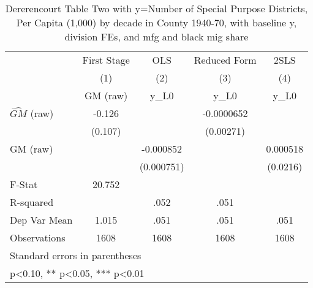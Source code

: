 \begin{table}[htbp]\centering
\def\sym#1{\ifmmode^{#1}\else\(^{#1}\)\fi}
\caption{Dererencourt Table Two with y=Number of Special Purpose Districts, Per Capita (1,000) by decade in County 1940-70, with baseline y, division FEs, and mfg and black mig share}
\begin{tabular}{l*{4}{c}}
\toprule
                    & First Stage   &         OLS   &Reduced Form   &        2SLS   \\
                    &\multicolumn{1}{c}{(1)}&\multicolumn{1}{c}{(2)}&\multicolumn{1}{c}{(3)}&\multicolumn{1}{c}{(4)}\\
                    &\multicolumn{1}{c}{GM  (raw)}&\multicolumn{1}{c}{y\_L0}&\multicolumn{1}{c}{y\_L0}&\multicolumn{1}{c}{y\_L0}\\
\midrule
$\hat{GM}$ (raw)    &      -0.126   &               &  -0.0000652   &               \\
                    &     (0.107)   &               &   (0.00271)   &               \\
\addlinespace
GM  (raw)           &               &   -0.000852   &               &    0.000518   \\
                    &               &  (0.000751)   &               &    (0.0216)   \\
\midrule
F-Stat              &      20.752   &               &               &               \\
R-squared           &               &        .052   &        .051   &               \\
Dep Var Mean        &       1.015   &        .051   &        .051   &        .051   \\
Observations        &        1608   &        1608   &        1608   &        1608   \\
\bottomrule
\multicolumn{5}{l}{\footnotesize Standard errors in parentheses}\\
\multicolumn{5}{l}{\footnotesize * p<0.10, ** p<0.05, *** p<0.01}\\
\end{tabular}
\end{table}
